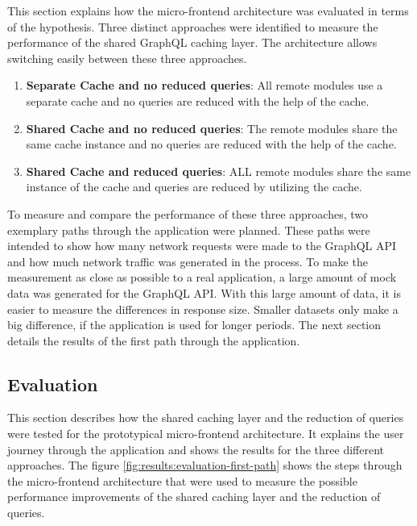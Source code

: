 This section explains how the micro-frontend architecture was evaluated in terms of the hypothesis. Three distinct approaches were identified to measure the performance of the shared GraphQL caching layer. The architecture allows switching easily between these three approaches.

\begin{enumerate}
  \item \textbf{Separate Cache and no reduced queries}: All remote modules use a separate cache and no queries are reduced with the help of the cache.
  \item \textbf{Shared Cache and no reduced queries}: The remote modules share the same cache instance and no queries are reduced with the help of the cache.
  \item \textbf{Shared Cache and reduced queries}: ALL remote modules share the same instance of the cache and queries are reduced by utilizing the cache.
\end{enumerate}

\noindent To measure and compare the performance of these three approaches, two exemplary paths through the application were planned. These paths were intended to show how many network requests were made to the GraphQL \ac{API} and how much network traffic was generated in the process. To make the measurement as close as possible to a real application, a large amount of mock data was generated for the GraphQL \ac{API}. With this large amount of data, it is easier to measure the differences in response size. Smaller datasets only make a big difference, if the application is used for longer periods. The next section details the results of the first path through the application.

\subsection{Evaluation}\label{subsection:results:performance-measurement:evaluation}

This section describes how the shared caching layer and the reduction of queries were tested for the prototypical micro-frontend architecture. It explains the user journey through the application and shows the results for the three different approaches. The figure \ref{fig:results:evaluation-first-path} shows the steps through the micro-frontend architecture that were used to measure the possible performance improvements of the shared caching layer and the reduction of queries.

